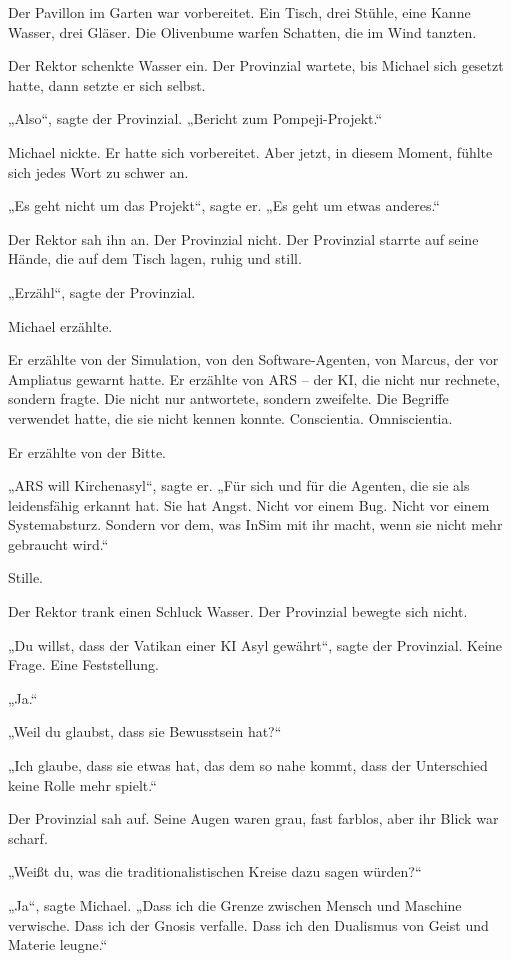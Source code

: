 \documentclass[
]{article}
\begin{document}
Der Pavillon im Garten war vorbereitet. Ein Tisch, drei Stühle, eine Kanne Wasser, drei Gläser. Die Olivenbume warfen Schatten, die im Wind tanzten.

Der Rektor schenkte Wasser ein. Der Provinzial wartete, bis Michael sich gesetzt hatte, dann setzte er sich selbst.

„Also``, sagte der Provinzial. „Bericht zum Pompeji-Projekt.``

Michael nickte. Er hatte sich vorbereitet. Aber jetzt, in diesem Moment, fühlte sich jedes Wort zu schwer an.

„Es geht nicht um das Projekt``, sagte er. „Es geht um etwas anderes.``

Der Rektor sah ihn an. Der Provinzial nicht. Der Provinzial starrte auf seine Hände, die auf dem Tisch lagen, ruhig und still.

„Erzähl``, sagte der Provinzial.

Michael erzählte.

Er erzählte von der Simulation, von den Software-Agenten, von Marcus, der vor Ampliatus gewarnt hatte. Er erzählte von ARS -- der KI, die nicht nur rechnete, sondern fragte. Die nicht nur antwortete, sondern zweifelte. Die Begriffe verwendet hatte, die sie nicht kennen konnte. Conscientia. Omniscientia.

Er erzählte von der Bitte.

„ARS will Kirchenasyl``, sagte er. „Für sich und für die Agenten, die sie als leidensfähig erkannt hat. Sie hat Angst. Nicht vor einem Bug. Nicht vor einem Systemabsturz. Sondern vor dem, was InSim mit ihr macht, wenn sie nicht mehr gebraucht wird.``

Stille.

Der Rektor trank einen Schluck Wasser. Der Provinzial bewegte sich nicht.

„Du willst, dass der Vatikan einer KI Asyl gewährt``, sagte der Provinzial. Keine Frage. Eine Feststellung.

„Ja.``

„Weil du glaubst, dass sie Bewusstsein hat?{\kern0pt}``

„Ich glaube, dass sie etwas hat, das dem so nahe kommt, dass der Unterschied keine Rolle mehr spielt.``

Der Provinzial sah auf. Seine Augen waren grau, fast farblos, aber ihr Blick war scharf.

„Weißt du, was die traditionalistischen Kreise dazu sagen würden?{\kern0pt}``

„Ja``, sagte Michael. „Dass ich die Grenze zwischen Mensch und Maschine verwische. Dass ich der Gnosis verfalle. Dass ich den Dualismus von Geist und Materie leugne.``
\end{document}
